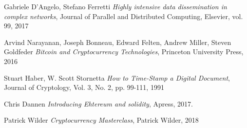 \begin{thebibliography}{99}

 Gabriele D'Angelo, Stefano Ferretti
{\em Highly intensive data dissemination in complex networks},
Journal of Parallel and Distributed Computing, Elsevier, vol. 99, 2017

 Arvind Narayanan, Joseph Bonneau, Edward Felten, Andrew Miller, Steven Goldfeder
{\em Bitcoin and Cryptocurrency Technologies},
Princeton University Press, 2016

 Stuart Haber, W. Scott Stornetta
{\em How to Time-Stamp a Digital Document},
Journal of Cryptology, Vol. 3, No. 2, pp. 99-111, 1991

 Chris Dannen
{\em Introducing Ehtereum and solidity},
Apress, 2017.

 Patrick Wilder
{\em Cryptocurrency Masterclass},
Patrick Wilder, 2018

\end{thebibliography}
